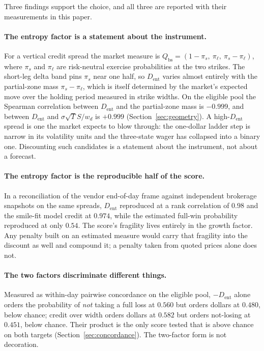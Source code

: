 \documentclass[11pt]{article}
\newcommand{\dent}{D_{\mathrm{ent}}}
\newcommand{\Qbs}{Q_{\mathrm{bs}}}
\begin{document}
Three findings support the choice, and all three are reported with their
measurements in this paper.

\paragraph{The entropy factor is a statement about the instrument.} For a
vertical credit spread the market measure is
$\Qbs = (1 - \pi_s,\ \pi_\ell,\ \pi_s - \pi_\ell)$, where $\pi_s$ and
$\pi_\ell$ are risk-neutral exercise probabilities at the two strikes. The
short-leg delta band pins $\pi_s$ near one half, so $\dent$ varies almost
entirely with the partial-zone mass $\pi_s - \pi_\ell$, which is itself
determined by the market's expected move over the holding period measured in
strike widths. On the eligible pool the Spearman correlation between $\dent$
and the partial-zone mass is $-0.999$, and between $\dent$ and
$\sigma\sqrt{T}S/w_d$ is $+0.999$ (Section~\ref{sec:geometry}). A high-$\dent$
spread is one the market expects to blow through: the one-dollar ladder step
is narrow in its volatility units and the three-state wager has collapsed into
a binary one. Discounting such candidates is a statement about the instrument,
not about a forecast.

\paragraph{The entropy factor is the reproducible half of the score.} In a
reconciliation of the vendor end-of-day frame against independent brokerage
snapshots on the same spreads, $\dent$ reproduced at a rank correlation of
$0.98$ and the smile-fit model credit at $0.974$, while the estimated full-win
probability reproduced at only $0.54$. The score's fragility lives entirely in
the growth factor. Any penalty built on an estimated measure would carry that
fragility into the discount as well and compound it; a penalty taken from
quoted prices alone does not.

\paragraph{The two factors discriminate different things.} Measured as
within-day pairwise concordance on the eligible pool, $-\dent$ alone orders
the probability of \emph{not} taking a full loss at $0.560$ but orders dollars
at $0.480$, below chance; credit over width orders dollars at $0.582$ but
orders not-losing at $0.451$, below chance. Their product is the only score
tested that is above chance on both targets (Section~\ref{sec:concordance}).
The two-factor form is not decoration.
\end{document}
